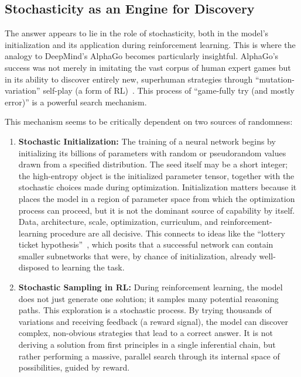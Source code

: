 \documentclass[%
  reprint,
  superscriptaddress,
  showpacs,
  showkeys,
  amsmath,amssymb,
  pra,
  longbibliography,
  floatfix,
  x11names
]{revtex4-2}
\begin{document}
\subsection{Stochasticity as an Engine for Discovery}

The answer appears to lie in the role of stochasticity,
both in the model's initialization and its application during reinforcement learning.
This is where the analogy to DeepMind's AlphaGo becomes particularly insightful.
AlphaGo's success was not merely in imitating the vast corpus of human expert games
but in its ability to discover entirely new, superhuman strategies through ``mutation-variation'' self-play
(a form of RL)~\cite{Silver-2017}. This process of ``game-fully try (and mostly error)''
is a powerful search mechanism.

This mechanism seems to be critically dependent on two sources of randomness:
\begin{enumerate}
    \item \textbf{Stochastic Initialization:} The training of a neural network begins by initializing its billions of parameters with random or pseudorandom values drawn from a specified distribution. The seed itself may be a short integer; the high-entropy object is the initialized parameter tensor, together with the stochastic choices made during optimization. Initialization matters because it places the model in a region of parameter space from which the optimization process can proceed, but it is not the dominant source of capability by itself. Data, architecture, scale, optimization, curriculum, and reinforcement-learning procedure are all decisive. This connects to ideas like the ``lottery ticket hypothesis''~\cite{frankle2018the}, which posits that a successful network can contain smaller subnetworks that were, by chance of initialization, already well-disposed to learning the task.

    \item \textbf{Stochastic Sampling in RL:} During reinforcement learning, the model does not just generate one solution; it samples many potential reasoning paths. This exploration is a stochastic process. By trying thousands of variations and receiving feedback (a reward signal), the model can discover complex, non-obvious strategies that lead to a correct answer. It is not deriving a solution from first principles in a single inferential chain, but rather performing a massive, parallel search through its internal space of possibilities, guided by reward.
\end{enumerate}
\end{document}
